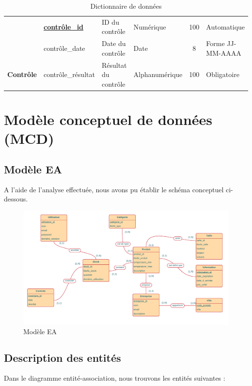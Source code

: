 \begin{table}[ht!]
{\begin{tabular}{c|lllcl|}
\multicolumn{1}{|c|}{} &
  \multicolumn{1}{l|}{{\ul \textbf{contrôle\_id}}} &
  \multicolumn{1}{l|}{ID du contrôle} &
  \multicolumn{1}{l|}{Numérique} &
  \multicolumn{1}{c|}{100} &
  Automatique \\
\multicolumn{1}{|c|}{} &
  \multicolumn{1}{l|}{contrôle\_date} &
  \multicolumn{1}{l|}{Date du contrôle} &
  \multicolumn{1}{l|}{Date} &
  \multicolumn{1}{c|}{8} &
  Forme JJ-MM-AAAA \\
\multicolumn{1}{|c|}{\multirow{}{}{\textbf{Contrôle}}} &
  \multicolumn{1}{l|}{contrôle\_résultat} &
  \multicolumn{1}{l|}{Résultat du contrôle} &
  \multicolumn{1}{l|}{Alphanumérique} &
  \multicolumn{1}{c|}{100} &
  Obligatoire \\ \hline
\end{tabular}
}
\caption{Dictionnaire de données}
\end{table}


\section{Modèle conceptuel de données (MCD)}
\subsection{Modèle EA}
A l’aide de l’analyse effectuée, nous avons pu établir le schéma conceptuel ci-dessous.
\begin{figure}[ht!]
    \centering
    \includegraphics[keepaspectratio=true,scale=0.6]{Figures/mcd.pdf}
    \caption{Modèle EA}
    \label{fig:structure}
\end{figure}

\subsection{Description des entités}
Dans le diagramme entité-association, nous trouvons les entités suivantes :

